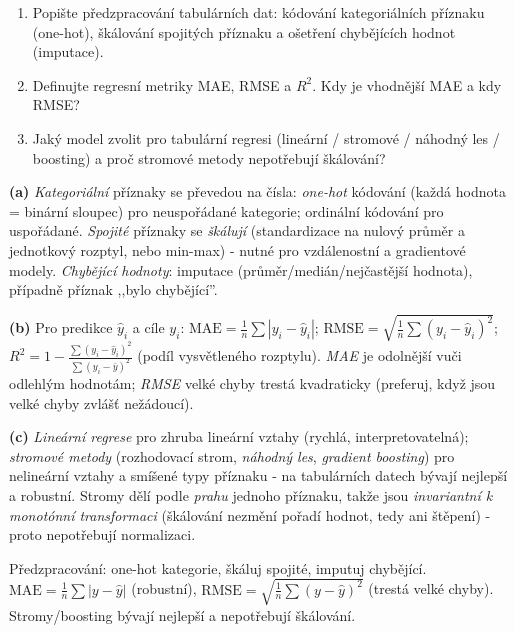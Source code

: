 \begin{zadani}
\begin{enumerate}[label=(\alph*)]
  \item {} Popište předzpracování tabulárních dat: kódování kategoriálních příznaku (one-hot), škálování spojitých příznaku a ošetření chybějících hodnot (imputace).
  \item {} Definujte regresní metriky MAE, RMSE a $R^2$. Kdy je vhodnější MAE a kdy RMSE?
  \item {} Jaký model zvolit pro tabulární regresi (lineární / stromové / náhodný les / boosting) a proč stromové metody nepotřebují škálování?
\end{enumerate}
\end{zadani}

\begin{reseni}
\textbf{(a)} \emph{Kategoriální} příznaky se převedou na čísla: \emph{one-hot} kódování (každá hodnota = binární sloupec) pro neuspořádané kategorie; ordinální kódování pro uspořádané. \emph{Spojité} příznaky se \emph{škálují} (standardizace na nulový průměr a jednotkový rozptyl, nebo min-max) - nutné pro vzdálenostní a gradientové modely. \emph{Chybějící hodnoty}: imputace (průměr/medián/nejčastější hodnota), případně příznak ,,bylo chybějící''.

\textbf{(b)} Pro predikce $\hat y_i$ a cíle $y_i$: $\mathrm{MAE}=\tfrac1n\sum|y_i-\hat y_i|$; $\mathrm{RMSE}=\sqrt{\tfrac1n\sum(y_i-\hat y_i)^2}$; $R^2=1-\frac{\sum(y_i-\hat y_i)^2}{\sum(y_i-\bar y)^2}$ (podíl vysvětleného rozptylu). \emph{MAE} je odolnější vuči odlehlým hodnotám; \emph{RMSE} velké chyby trestá kvadraticky (preferuj, když jsou velké chyby zvlášť nežádoucí).

\textbf{(c)} \emph{Lineární regrese} pro zhruba lineární vztahy (rychlá, interpretovatelná); \emph{stromové metody} (rozhodovací strom, \emph{náhodný les}, \emph{gradient boosting}) pro nelineární vztahy a smíšené typy příznaku - na tabulárních datech bývají nejlepší a robustní. Stromy dělí podle \emph{prahu} jednoho příznaku, takže jsou \emph{invariantní k monotónní transformaci} (škálování nezmění pořadí hodnot, tedy ani štěpení) - proto nepotřebují normalizaci.
\end{reseni}

\begin{jadro}
Předzpracování: one-hot kategorie, škáluj spojité, imputuj chybějící. $\mathrm{MAE}=\frac1n\sum|y-\hat y|$ (robustní), $\mathrm{RMSE}=\sqrt{\frac1n\sum(y-\hat y)^2}$ (trestá velké chyby). Stromy/boosting bývají nejlepší a nepotřebují škálování.
\end{jadro}

